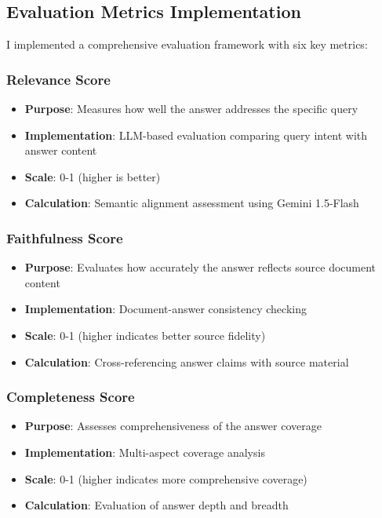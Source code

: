 \documentclass[12pt,a4paper]{article}
\begin{document}
\subsection{Evaluation Metrics Implementation}

I implemented a comprehensive evaluation framework with six key metrics:

\subsubsection{Relevance Score}
\begin{itemize}
    \item \textbf{Purpose}: Measures how well the answer addresses the specific query
    \item \textbf{Implementation}: LLM-based evaluation comparing query intent with answer content
    \item \textbf{Scale}: 0-1 (higher is better)
    \item \textbf{Calculation}: Semantic alignment assessment using Gemini 1.5-Flash
\end{itemize}

\subsubsection{Faithfulness Score}
\begin{itemize}
    \item \textbf{Purpose}: Evaluates how accurately the answer reflects source document content
    \item \textbf{Implementation}: Document-answer consistency checking
    \item \textbf{Scale}: 0-1 (higher indicates better source fidelity)
    \item \textbf{Calculation}: Cross-referencing answer claims with source material
\end{itemize}

\subsubsection{Completeness Score}
\begin{itemize}
    \item \textbf{Purpose}: Assesses comprehensiveness of the answer coverage
    \item \textbf{Implementation}: Multi-aspect coverage analysis
    \item \textbf{Scale}: 0-1 (higher indicates more comprehensive coverage)
    \item \textbf{Calculation}: Evaluation of answer depth and breadth
\end{itemize}
\end{document}
